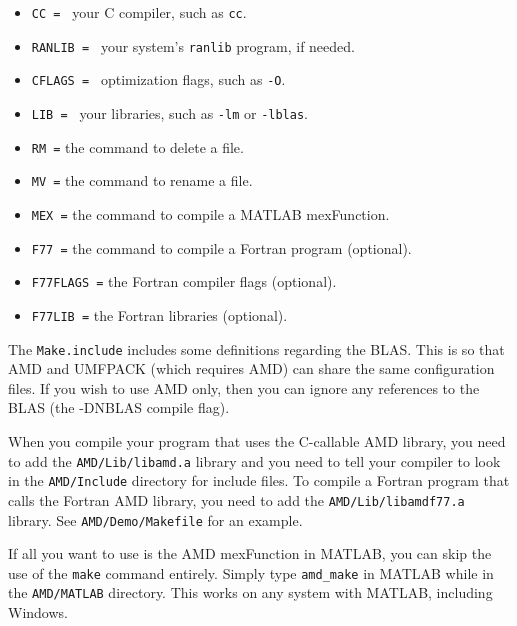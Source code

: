 \documentclass[11pt]{article}
\begin{document}
\begin{itemize}
\item {\tt CC = } your C compiler, such as {\tt cc}.
\item {\tt RANLIB = } your system's {\tt ranlib} program, if needed.
\item {\tt CFLAGS = } optimization flags, such as {\tt -O}.
\item {\tt LIB = } your libraries, such as {\tt -lm} or {\tt -lblas}.
\item {\tt RM =} the command to delete a file.
\item {\tt MV =} the command to rename a file.
\item {\tt MEX =} the command to compile a MATLAB mexFunction.
\item {\tt F77 =} the command to compile a Fortran program (optional).
\item {\tt F77FLAGS =} the Fortran compiler flags (optional).
\item {\tt F77LIB =} the Fortran libraries (optional).
\end{itemize}

The {\tt Make.include} includes some definitions regarding the BLAS.
This is so that AMD and UMFPACK (which requires AMD) can share
the same configuration files.  If you wish to use AMD only, then
you can ignore any references to the BLAS (the -DNBLAS compile flag).

When you compile your program that uses the C-callable AMD library,
you need to add the {\tt AMD/Lib/libamd.a} library
and you need to tell your compiler to look in the
{\tt AMD/Include} directory for include
files.   To compile a Fortran program that calls the Fortran AMD library,
you need to add the {\tt AMD/Lib/libamdf77.a} library.
See {\tt AMD/Demo/Makefile} for an example.

If all you want to use is the AMD mexFunction in MATLAB, you can skip
the use of the {\tt make} command entirely.  Simply type
{\tt amd\_make} in MATLAB while in the {\tt AMD/MATLAB} directory.
This works on any system with MATLAB, including Windows.
\end{document}
